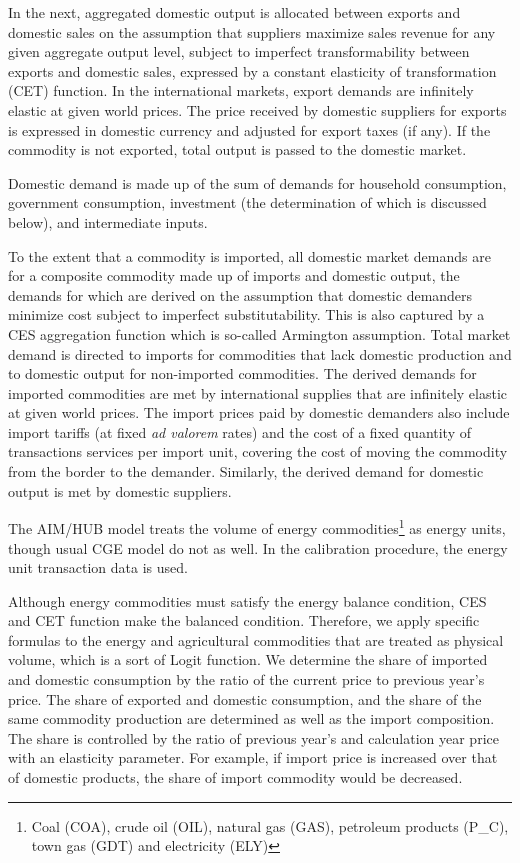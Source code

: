 \documentclass[10pt,a4paper,titlepage,dvipdfmx]{book}
\begin{document}
In the next, aggregated domestic output is allocated between exports and domestic sales on the assumption that suppliers maximize sales revenue for any given aggregate output level, subject to imperfect transformability between exports and domestic sales, expressed by a constant elasticity of transformation (CET) function. In the international markets, export demands are infinitely elastic at given world prices. The price received by domestic suppliers for exports is expressed in domestic currency and adjusted for export taxes (if any). If the commodity is not exported, total output is passed to the domestic market.

Domestic demand is made up of the sum of demands for household consumption, government consumption, investment (the determination of which is discussed below), and intermediate inputs.

To the extent that a commodity is imported, all domestic market demands are for a composite commodity made up of imports and domestic output, the demands for which are derived on the assumption that domestic demanders minimize cost subject to imperfect substitutability. This is also captured by a CES aggregation function which is so-called Armington assumption. Total market demand is directed to imports for commodities that lack domestic production and to domestic output for non-imported commodities. The derived demands for imported commodities are met by international supplies that are infinitely elastic at given world prices. The import prices paid by domestic demanders also include import tariffs (at fixed \textit{ad valorem} rates) and the cost of a fixed quantity of transactions services per import unit, covering the cost of moving the commodity from the border to the demander. Similarly, the derived demand for domestic output is met by domestic suppliers. 

The AIM/HUB model treats the volume of energy commodities\footnote{Coal (COA), crude oil (OIL), natural gas (GAS), petroleum products (P\_C), town gas (GDT) and electricity (ELY)} as energy units, though usual CGE model do not as well. In the calibration procedure, the energy unit transaction data is used.

Although energy commodities must satisfy the energy balance condition, CES and CET function make the balanced condition. Therefore, we apply specific formulas to the energy and agricultural commodities that are treated as physical volume, which is a sort of Logit function. We determine the share of imported and domestic consumption by the ratio of the current price to previous year's price. The share of exported and domestic consumption, and the share of the same commodity production are determined as well as the import composition. The share is controlled by the ratio of previous year's and calculation year price with an elasticity parameter. For example, if import price is increased over that of domestic products, the share of import commodity would be decreased.
\end{document}
